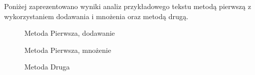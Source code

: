 \documentclass[12pt,a4paper]{article} %
\begin{document}
Poniżej zaprezentowano wyniki analiz przykładowego tekstu metodą pierwszą z wykorzystaniem dodawania i mnożenia oraz metodą drugą.

\begin{figure}[!h]
\caption{Metoda Pierwsza, dodawanie}
\label{fig:met1_add}
\centering
\end{figure}

\begin{figure}[!h]
\caption{Metoda Pierwsza, mnożenie}
\label{fig:met1_mul}
\centering
\end{figure}

\begin{figure}[!h]
\caption{Metoda Druga}
\label{fig:met2}
\centering
\end{figure}
\end{document}
